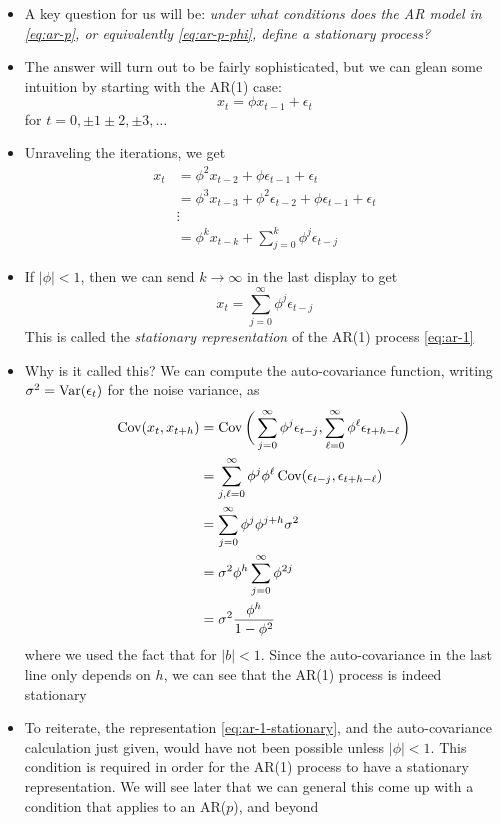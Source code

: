 \documentclass{article}
\begin{document}
\begin{itemize}
\item A key question for us will be: \emph{under what conditions does the AR
    model  in \eqref{eq:ar-p}, or equivalently \eqref{eq:ar-p-phi}, define a
    stationary process?} 

\item The answer will turn out to be fairly sophisticated, but we can glean some
  intuition by starting with the AR(1) case: 
  \begin{equation}
  \label{eq:ar-1}
  x_t = \phi x_{t-1} + \epsilon_t 
  \end{equation}
  for  $t = 0, \pm 1 \pm 2, \pm 3,\dots$ 

\item Unraveling the iterations, we get
  \begin{align*}
  x_t &= \phi^2 x_{t-2} + \phi \epsilon_{t-1} + \epsilon_t \\
  &= \phi^3 x_{t-3} + \phi^2 \epsilon_{t-2} + \phi \epsilon_{t-1} + \epsilon_t
    \\  
  &\vdots \\ 
  &= \phi^k x_{t-k} + \sum_{j=0}^k \phi^j \epsilon_{t-j} 
  \end{align*}

\item If $|\phi| < 1$, then we can send $k \to \infty$ in the last display to 
  get 
  \begin{equation}
  \label{eq:ar-1-stationary}
  x_t = \sum_{j=0}^\infty \phi^j \epsilon_{t-j} 
  \end{equation}
  This is called the \emph{stationary representation} of the AR(1) process
  \eqref{eq:ar-1} 

\item Why is it called this? We can compute the auto-covariance function,
  writing $\sigma^2 = \operatorname{Var}(\epsilon_t)$ for the noise variance, as
  \begin{align*}
  \operatorname{Cov}(x_t, x_{t+h}) &= \operatorname{Cov}\bigg( \sum_{j=0}^\infty \phi^j \epsilon_{t-j}, 
  \sum_{\ell=0}^\infty \phi^\ell \epsilon_{t+h-\ell} \bigg) \\
  &= \sum_{j,\ell=0}^\infty \phi^j \phi^\ell \operatorname{Cov}( \epsilon_{t-j},
    \epsilon_{t+h-\ell} ) \\
  &= \sum_{j=0}^\infty \phi^j \phi^{j+h} \sigma^2 \\
  &= \sigma^2 \phi^h \sum_{j=0}^\infty \phi^{2j} \\
  &= \sigma^2 \frac{\phi^h}{1 - \phi^2} 
  \end{align*}
  where we used the fact that  for $|b|
  < 1$. Since the auto-covariance in the last line only depends on $h$, we can
  see that the AR(1) process is indeed stationary

\item To reiterate, the representation \eqref{eq:ar-1-stationary}, and the
  auto-covariance calculation just given, would have not been possible unless
  $|\phi| < 1$. This condition is required in order for the AR(1) process to
  have a stationary representation. We will see later that we can general this
  come up with a condition that applies to an AR($p$), and beyond
\end{itemize}
\end{document}
